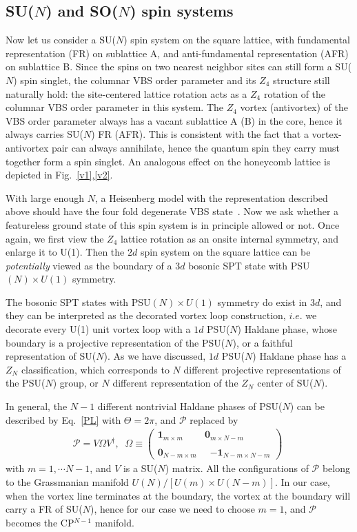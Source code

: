 \documentclass[aps,prb,twocolumn,superscriptaddress,showpacs]{revtex4}
\newcommand{\beqn}{\begin{eqnarray}}
\newcommand{\eeqn}{\end{eqnarray}}
\begin{document}
\subsection{SU($N$) and SO($N$) spin systems}

Now let us consider a SU($N$) spin system on the square lattice,
with fundamental representation (FR) on sublattice A, and
anti-fundamental representation (AFR) on sublattice B. Since the
spins on two nearest neighbor sites can still form a SU($N$) spin
singlet, the columnar VBS order parameter and its $Z_4$ structure
still naturally hold: the site-centered lattice rotation acts as a
$Z_4$ rotation of the columnar VBS order parameter in this system.
The $Z_4$ vortex (antivortex) of the VBS order parameter always
has a vacant sublattice A (B) in the core, hence it always carries
SU($N$) FR (AFR). This is consistent with the fact that a
vortex-antivortex pair can always annihilate, hence the quantum
spin they carry must together form a spin singlet. An analogous
effect on the honeycomb lattice is depicted in
Fig.~\ref{v1},\ref{v2}.

With large enough $N$, a Heisenberg model with the representation
described above should have the four fold degenerate VBS
state~\cite{sachdevread3,sachdevread2}. Now we ask whether a
featureless ground state of this spin system is in principle
allowed or not. Once again, we first view the $Z_4$ lattice
rotation as an onsite internal symmetry, and enlarge it to U(1).
Then the $2d$ spin system on the square lattice can be {\it
potentially} viewed as the boundary of a $3d$ bosonic SPT state
with PSU$(N)\times U(1)$ symmetry.

The bosonic SPT states with PSU$(N)\times U(1)$ symmetry do exist
in $3d$, and they can be interpreted as the decorated vortex loop
construction, $i.e.$ we decorate every U(1) unit vortex loop with
a $1d$ PSU($N$) Haldane phase, whose boundary is a projective
representation of the PSU($N$), or a faithful representation of
SU($N$). As we have discussed, $1d$ PSU($N$) Haldane phase has a
$Z_N$ classification, which corresponds to $N$ different
projective representations of the PSU($N$) group, or $N$ different
representation of the $Z_N$ center of SU($N$).

In general, the $N-1$ different nontrivial Haldane phases of
PSU($N$) can be described by Eq.~\ref{PL} with $\Theta = 2\pi$,
and $\mathcal{P}$ replaced by~\cite{affleck} \beqn \mathcal{P} = V
\Omega V^\dagger, \;\;\Omega \equiv\! \left(
\begin{array}{cccc}
\mathbf{1}_{m \times m} & \mathbf{0}_{ m \times N-m} \\ \\
\mathbf{0}_{N-m \times m} & \;\;\mathbf{-1}_{N-m \times N-m}
\end{array}
\right) \;\label{PP}\eeqn with $m = 1, \cdots N-1$, and $V$ is a
SU($N$) matrix. All the configurations of $\mathcal{P}$ belong to
the Grassmanian manifold $U(N)/[U(m) \times U(N-m)]$. In our case,
when the vortex line terminates at the boundary, the vortex at the
boundary will carry a FR of SU($N$), hence for our case we need to
choose $m = 1$, and $\mathcal{P}$ becomes the CP$^{N-1}$ manifold.
\end{document}
